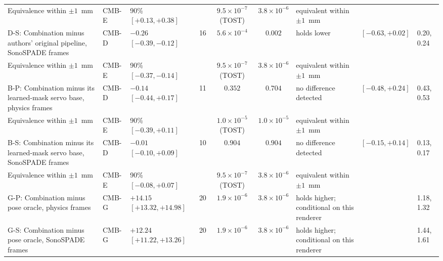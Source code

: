 \begin{table}[tp]
\begin{tabularx}{\textwidth}{@{}>{\raggedright\arraybackslash}X l l c c c >{\raggedright\arraybackslash}p{} l l@{}}
\quad\quad Equivalence within $\pm 1$~mm & CMB-E & 90\% $[+0.13, +0.38]$ & & $9.5 \times 10^{-7}$ (TOST) & $3.8 \times 10^{-6}$ & equivalent within $\pm 1$~mm & & \\
\quad D-S: Combination minus authors' original pipeline, SonoSPADE frames & CMB-D & $-0.26$ $[-0.39, -0.12]$ & 16 & $5.6 \times 10^{-4}$ & $0.002$ & holds lower & $[-0.63, +0.02]$ & 0.20, 0.24 \\
\quad\quad Equivalence within $\pm 1$~mm & CMB-E & 90\% $[-0.37, -0.14]$ & & $9.5 \times 10^{-7}$ (TOST) & $3.8 \times 10^{-6}$ & equivalent within $\pm 1$~mm & & \\
\quad B-P: Combination minus its learned-mask servo base, physics frames & CMB-D & $-0.14$ $[-0.44, +0.17]$ & 11 & $0.352$ & $0.704$ & no difference detected & $[-0.48, +0.24]$ & 0.43, 0.53 \\
\quad\quad Equivalence within $\pm 1$~mm & CMB-E & 90\% $[-0.39, +0.11]$ & & $1.0 \times 10^{-5}$ (TOST) & $1.0 \times 10^{-5}$ & equivalent within $\pm 1$~mm & & \\
\quad B-S: Combination minus its learned-mask servo base, SonoSPADE frames & CMB-D & $-0.01$ $[-0.10, +0.09]$ & 10 & $0.904$ & $0.904$ & no difference detected & $[-0.15, +0.14]$ & 0.13, 0.17 \\
\quad\quad Equivalence within $\pm 1$~mm & CMB-E & 90\% $[-0.08, +0.07]$ & & $9.5 \times 10^{-7}$ (TOST) & $3.8 \times 10^{-6}$ & equivalent within $\pm 1$~mm & & \\
\quad G-P: Combination minus pose oracle, physics frames & CMB-G & $+14.15$ $[+13.32, +14.98]$ & 20 & $1.9 \times 10^{-6}$ & $3.8 \times 10^{-6}$ & holds higher; conditional on this renderer & & 1.18, 1.32 \\
\quad G-S: Combination minus pose oracle, SonoSPADE frames & CMB-G & $+12.24$ $[+11.22, +13.26]$ & 20 & $1.9 \times 10^{-6}$ & $3.8 \times 10^{-6}$ & holds higher; conditional on this renderer & & 1.44, 1.61 \\
\bottomrule
\end{tabularx}
\end{table}

